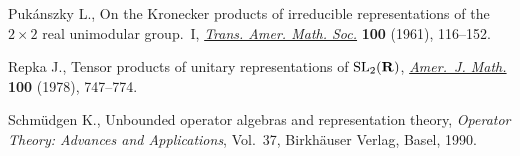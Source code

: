 \documentclass[pdftex]{sigma}
\numberwithin{equation}{section}
\numberwithin{theorem}{section}
\numberwithin{proposition}{section}
\numberwithin{lemma}{section}
\numberwithin{corollary}{section}
\numberwithin{definition}{section}
\numberwithin{example}{section}
\numberwithin{remark}{section}
\numberwithin{note}{section}
\begin{document}
\begin{thebibliography}{99}
Puk\'anszky L.,
On the Kronecker products of irreducible representations of the $2\times 2$ real unimodular group.~I,
\href{http://dx.doi.org/10.2307/1993356}{{\it Trans. Amer. Math. Soc.}} \textbf{100} (1961), 116--152.

Repka J.,
Tensor products of unitary representations of ${\rm SL}_{2}({\bf R})$,
\href{http://dx.doi.org/10.2307/2373909}{{\it Amer.~J. Math.}} \textbf{100} (1978),   747--774.

Schm\"udgen K.,
Unbounded operator algebras and representation theory,
{\it Operator Theory: Advances and Applications}, Vol.~37, Birkh\"auser Verlag, Basel, 1990.

\end{thebibliography}\LastPageEnding
\end{document}
